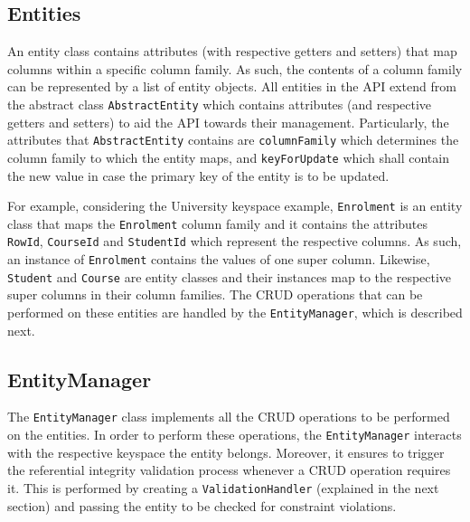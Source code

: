	\subsection{Entities} 
	
	An entity class contains attributes (with respective getters and setters) that
	map columns within a specific column family. As such, the contents of a
	column family can be represented by a list of entity objects. All entities in
	the \ac{API} extend from the abstract class \texttt{AbstractEntity} which
	contains attributes (and respective getters and setters) to
	aid the \ac{API} towards their management. Particularly, the attributes
	that \texttt{AbstractEntity} contains  are \texttt{columnFamily} which
	determines the column family to which the entity maps, and 
	\texttt{keyForUpdate} which shall contain the new value in case the primary key
	of the entity is to be updated.
	
	For example,  considering the University keyspace example, \texttt{Enrolment} 
	is an entity class that  maps the \texttt{Enrolment}  column family and
	it contains the attributes \texttt{RowId}, \texttt{CourseId} and
	\texttt{StudentId} which represent the respective columns. As such, an instance
	of \texttt{Enrolment} contains the values of one super column. Likewise,
	\texttt{Student} and \texttt{Course} are entity classes and their instances 
	map to the respective super columns in their column families.
	The \ac{CRUD} operations that can be performed on these entities   are
	handled by the \texttt{EntityManager},  which is described next.
		
	\subsection{EntityManager}

	The  \texttt{EntityManager} class implements  all
	the \ac{CRUD} operations to be performed on the entities. In order to perform
	these operations,  the \texttt{EntityManager} interacts with the respective
	keyspace the entity belongs. Moreover, it ensures to trigger the   referential
	integrity validation process whenever a \ac{CRUD} operation requires it. This
	is performed by creating a  \texttt{ValidationHandler} (explained in the next
	section) and passing the entity to be checked for constraint violations. 
	
